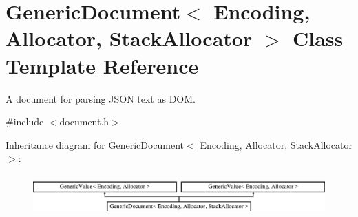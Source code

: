 \hypertarget{class_generic_document}{}\section{Generic\+Document$<$ Encoding, Allocator, Stack\+Allocator $>$ Class Template Reference}
\label{class_generic_document}


A document for parsing J\+S\+ON text as D\+OM.  




{\ttfamily \#include $<$document.\+h$>$}

Inheritance diagram for Generic\+Document$<$ Encoding, Allocator, Stack\+Allocator $>$\+:\begin{figure}[H]
\begin{center}
\leavevmode
\includegraphics[height=1.604584cm]{class_generic_document}
\end{center}
\end{figure}
